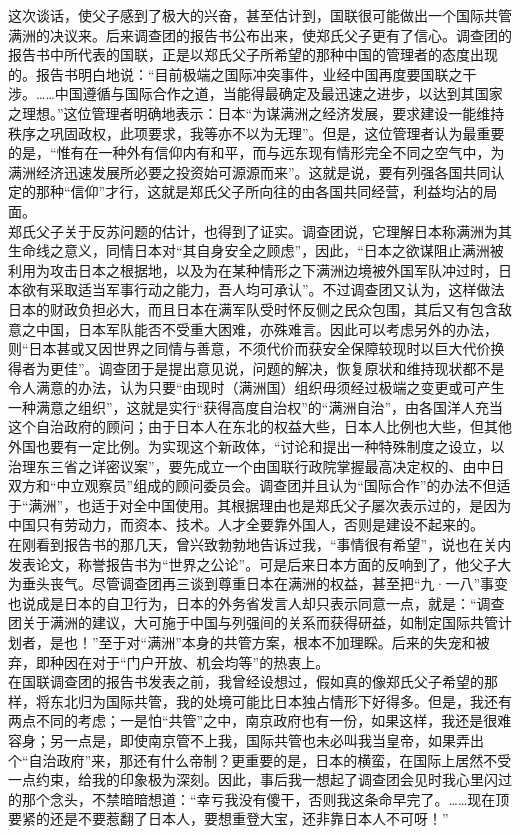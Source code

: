 这次谈话，使父子感到了极大的兴奋，甚至估计到，国联很可能做出一个国际共管满洲的决议来。后来调查团的报告书公布出来，使郑氏父子更有了信心。调查团的报告书中所代表的国联，正是以郑氏父子所希望的那种中国的管理者的态度出现的。报告书明白地说：“目前极端之国际冲突事件，业经中国再度要国联之干涉。……中国遵循与国际合作之道，当能得最确定及最迅速之进步，以达到其国家之理想。”这位管理者明确地表示：日本“为谋满洲之经济发展，要求建设一能维持秩序之巩固政权，此项要求，我等亦不以为无理”。但是，这位管理者认为最重要的是，“惟有在一种外有信仰内有和平，而与远东现有情形完全不同之空气中，为满洲经济迅速发展所必要之投资始可源源而来”。这就是说，要有列强各国共同认定的那种“信仰”才行，这就是郑氏父子所向往的由各国共同经营，利益均沾的局面。\\

郑氏父子关于反苏问题的估计，也得到了证实。调查团说，它理解日本称满洲为其生命线之意义，同情日本对“其自身安全之顾虑”，因此，“日本之欲谋阻止满洲被利用为攻击日本之根据地，以及为在某种情形之下满洲边境被外国军队冲过时，日本欲有采取适当军事行动之能力，吾人均可承认”。不过调查团又认为，这样做法日本的财政负担必大，而且日本在满军队受时怀反侧之民众包围，其后又有包含敌意之中国，日本军队能否不受重大困难，亦殊难言。因此可以考虑另外的办法，则“日本甚或又因世界之同情与善意，不须代价而获安全保障较现时以巨大代价换得者为更佳”。调查团于是提出意见说，问题的解决，恢复原状和维持现状都不是令人满意的办法，认为只要“由现时（满洲国）组织毋须经过极端之变更或可产生一种满意之组织”，这就是实行“获得高度自治权”的“满洲自治”，由各国洋人充当这个自治政府的顾问；由于日本人在东北的权益大些，日本人比例也大些，但其他外国也要有一定比例。为实现这个新政体，“讨论和提出一种特殊制度之设立，以治理东三省之详密议案”，要先成立一个由国联行政院掌握最高决定权的、由中日双方和“中立观察员”组成的顾问委员会。调查团并且认为“国际合作”的办法不但适于“满洲”，也适于对全中国使用。其根据理由也是郑氏父子屡次表示过的，是因为中国只有劳动力，而资本、技术。人才全要靠外国人，否则是建设不起来的。\\

在刚看到报告书的那几天，曾兴致勃勃地告诉过我，“事情很有希望”，说也在关内发表论文，称誉报告书为“世界之公论”。可是后来日本方面的反响到了，他父子大为垂头丧气。尽管调查团再三谈到尊重日本在满洲的权益，甚至把“九·一八”事变也说成是日本的自卫行为，日本的外务省发言人却只表示同意一点，就是：“调查团关于满洲的建议，大可施于中国与列强间的关系而获得研益，如制定国际共管计划者，是也！”至于对“满洲”本身的共管方案，根本不加理睬。后来的失宠和被弃，即种因在对于“门户开放、机会均等”的热衷上。\\

在国联调查团的报告书发表之前，我曾经设想过，假如真的像郑氏父子希望的那样，将东北归为国际共管，我的处境可能比日本独占情形下好得多。但是，我还有两点不同的考虑；一是怕“共管”之中，南京政府也有一份，如果这样，我还是很难容身；另一点是，即使南京管不上我，国际共管也未必叫我当皇帝，如果弄出个“自治政府”来，那还有什么帝制？更重要的是，日本的横蛮，在国际上居然不受一点约束，给我的印象极为深刻。因此，事后我一想起了调查团会见时我心里闪过的那个念头，不禁暗暗想道：“幸亏我没有傻干，否则我这条命早完了。……现在顶要紧的还是不要惹翻了日本人，要想重登大宝，还非靠日本人不可呀！”
